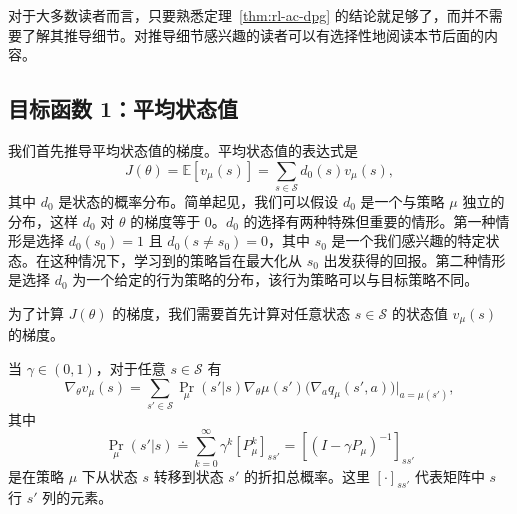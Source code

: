 对于大多数读者而言，只要熟悉定理~\ref{thm:rl-ac-dpg} 的结论就足够了，而并不需要了解其推导细节。对推导细节感兴趣的读者可以有选择性地阅读本节后面的内容。

\subsection*{目标函数 1：平均状态值}

我们首先推导平均状态值的梯度。平均状态值的表达式是
\begin{equation}
J(\theta) = \mathbb{E}[v_{\mu}(s)] = \sum_{s \in \mathcal{S}} d_{0}(s) v_{\mu}(s),
\label{eq:rl-ac-J-avgstate}
\end{equation}
其中 $d_{0}$ 是状态的概率分布。简单起见，我们可以假设 $d_{0}$ 是一个与策略 $\mu$ 独立的分布，这样 $d_{0}$ 对 $\theta$ 的梯度等于 0。$d_{0}$ 的选择有两种特殊但重要的情形。第一种情形是选择 $d_{0}(s_{0}) = 1$ 且 $d_{0}(s \neq s_{0}) = 0$，其中 $s_{0}$ 是一个我们感兴趣的特定状态。在这种情况下，学习到的策略旨在最大化从 $s_{0}$ 出发获得的回报。第二种情形是选择 $d_{0}$ 为一个给定的行为策略的分布，该行为策略可以与目标策略不同。

为了计算 $J(\theta)$ 的梯度，我们需要首先计算对任意状态 $s \in \mathcal{S}$ 的状态值 $v_{\mu}(s)$ 的梯度。

\begin{theorem}[$v_{\mu}(s)$ 的梯度（引理 10.1）]\label{thm:rl-ac-lemma-vmu}
当 $\gamma \in (0, 1)$，对于任意 $s \in \mathcal{S}$ 有
\begin{equation}
\nabla_{\theta} v_{\mu}(s) = \sum_{s' \in \mathcal{S}} \operatorname{Pr}_{\mu}(s' | s) \nabla_{\theta} \mu(s') \big( \nabla_{a} q_{\mu}(s', a) \big) \big|_{a = \mu(s')},
\label{eq:rl-ac-vmu-grad}
\end{equation}
其中
\[
\operatorname{Pr}_{\mu}(s' | s) \doteq \sum_{k=0}^{\infty} \gamma^{k} [P_{\mu}^{k}]_{ss'} = \left[ (I - \gamma P_{\mu})^{-1} \right]_{ss'}
\]
是在策略 $\mu$ 下从状态 $s$ 转移到状态 $s'$ 的折扣总概率。这里 $[\cdot]_{ss'}$ 代表矩阵中 $s$ 行 $s'$ 列的元素。
\end{theorem}

